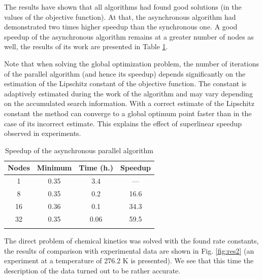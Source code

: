 \documentclass{svproc}
\begin{document}
The results have shown that all algorithms had found good solutions (in the values of the objective function). At that, the asynchronous algorithm had demonstrated two times higher speedup than the synchronous one. A good speedup of the asynchronous algorithm remains at a greater number of nodes as well, the results of its work are presented in Table \ref{tab_parall}.

\textcolor[rgb]{1,0,0}{Note that when solving the global optimization problem, the number of iterations of the parallel algorithm (and hence its speedup) depends significantly on the estimation of the Lipschitz constant of the objective function. The constant is adaptively estimated during the work of the algorithm and may vary depending on the accumulated search information. With a correct estimate of the Lipschitz constant the method can converge to a global optimum point faster than in the case of its incorrect estimate. This explains the effect of superlinear speedup observed in experiments.}

\begin{table}
\caption{Speedup of the asynchronous parallel algorithm}
\label{tab_parall}
\begin{center}
\begin{tabular}{cccc}
\hline\noalign{\smallskip}
Nodes  & Minimum  & Time (h.) & Speedup \\
\hline\noalign{\smallskip}
1  & 0.35   &   3.4     &   ---        \\
8  & 0.35   &   0.2     &   16.6       \\
16 & 0.36   &   0.1     &   34.3       \\
32 & 0.35   &   0.06    &   59.5       \\
\noalign{\smallskip}\hline
\end{tabular}\end{center}\end{table}

The direct problem of chemical kinetics was solved with the found rate constants, the results of comparison with experimental data are shown in Fig. \ref{fig:res2} (an experiment at a temperature of 276.2 K is presented). We see that this time the description of the data turned out to be rather accurate.
\end{document}
